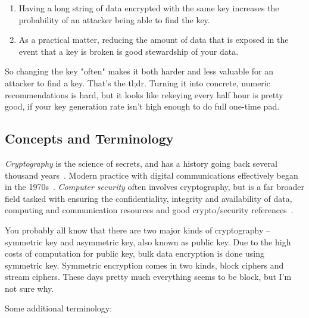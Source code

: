 \documentclass[%
 aip,
 jmp,%
 amsmath,amssymb,
 reprint,%
]{revtex4-1}
\begin{document}
\begin{enumerate}
\item Having a long string of data encrypted with the same key increases
the probability of an attacker being able to find the key.
\item As a practical matter, reducing the amount of data that is exposed
in the event that a key is broken is good stewardship of your data.
\end{enumerate}

So changing the key "often" makes it both harder and less valuable for
an attacker to find a key.  That's the tl;dr.  Turning it into
concrete, numeric recommendations is hard, but it looks like rekeying
every half hour is pretty good, if your key generation rate isn't high
enough to do full one-time pad.

\subsection{Concepts and Terminology}

\emph{Cryptography} is the science of secrets, and has a history going
back several thousand years~\cite{kahn1996codebreakers,singh1999code}.
Modern practice with digital communications effectively began in the
1970s~\cite{schneier96:_applied_crypto,handbook}.
\emph{Computer security} often involves cryptography, but is a far
broader field tasked with ensuring the confidentiality, integrity and
availability of data, computing and communication resources
 and good  crypto/security references~\cite{bishop2002art}.

You probably all know that there are two major kinds of cryptography
-- symmetric key and asymmetric key, also known as public key.  Due to
the high costs of computation for public key, bulk data encryption is
done using symmetric key.  Symmetric encryption comes in two kinds,
block ciphers and stream ciphers.  These days pretty much everything
seems to be block, but I'm not sure why.

Some additional terminology:
\end{document}

